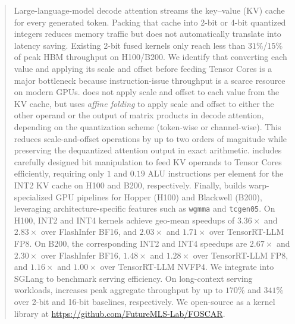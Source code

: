 \begin{abstract}
Large-language-model decode attention streams the key--value (KV) cache for every generated token.
Packing that cache into 2-bit or 4-bit quantized integers reduces memory traffic but does not automatically translate into latency saving.
Existing 2-bit fused kernels only reach less than $31\%$/$15\%$ of peak HBM throughput on H100/B200.
We identify that converting each value and applying its scale and offset before feeding Tensor Cores is a major bottleneck because instruction-issue throughput is a scarce resource on modern GPUs.
\sys{} does not apply scale and offset to each value from the KV cache, but uses \emph{affine folding} to apply scale and offset to either the other operand or the output of matrix products in decode attention, depending on the quantization scheme (token-wise or channel-wise).
This reduces scale-and-offset operations by up to two orders of magnitude while preserving the dequantized attention output in exact arithmetic.
\sys{} includes carefully designed bit manipulation to feed KV operands to Tensor Cores efficiently, requiring only $1$ and $0.19$ ALU instructions per element for the INT2 KV cache on H100 and B200, respectively.
Finally, \sys{} builds warp-specialized GPU pipelines for Hopper (H100) and Blackwell (B200), leveraging architecture-specific features such as \texttt{wgmma} and \texttt{tcgen05}.
On H100, \sys{} INT2 and INT4 kernels achieve geo-mean speedups of $3.36\times$ and $2.83\times$ over FlashInfer BF16, and $2.03\times$ and $1.71\times$ over TensorRT-LLM FP8.
On B200, the corresponding INT2 and INT4 speedups are $2.67\times$ and $2.30\times$ over FlashInfer BF16, $1.48\times$ and $1.28\times$ over TensorRT-LLM FP8, and $1.16\times$ and $1.00\times$ over TensorRT-LLM NVFP4.
We integrate \sys{} into SGLang to benchmark serving efficiency.
On long-context serving workloads, \sys{} increases peak aggregate throughput by up to $170\%$ and $341\%$ over 2-bit and 16-bit baselines, respectively.
We open-source \sys{} as a kernel library at \url{https://github.com/FutureMLS-Lab/FOSCAR}.
\end{abstract}
